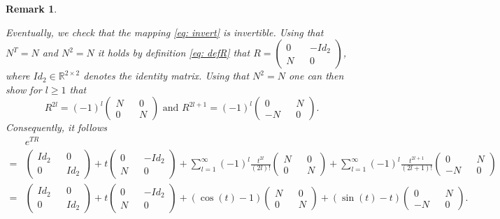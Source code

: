 \documentclass[11pt]{article}
\newcommand{\R}{\mathbb R}
\newtheorem{remark}{Remark}[section]
\begin{document}
\begin{remark}
\begin{enumerate}
Eventually, we check that the mapping \eqref{eq: invert} is invertible.
Using that $N^T = N$ and $N^2=N$ it holds by definition \eqref{eq: defR} that  $R = \begin{pmatrix}
    0 && - Id_2 \\ N && 0
\end{pmatrix}$, where $Id_2 \in \R^{2\times 2}$ denotes the identity matrix.
Using that $N^2 = N$ one can then show for $l\geq 1$ that
\[
R^{2l} = (-1)^l \begin{pmatrix}
    N && 0 \\ 0 && N
\end{pmatrix} \text{ and } R^{2l+1} = (-1)^l \begin{pmatrix}
    0 && N \\ -N && 0
\end{pmatrix}.
\]
Consequently, it follows 
\begin{align*}
&e^{TR} \\ = &\begin{pmatrix}
    Id_2 && 0  \\ 0 && Id_2
\end{pmatrix} + t \begin{pmatrix}
    0 && - Id_2 \\ N && 0
\end{pmatrix} + \sum_{l=1}^{\infty} (-1)^l \frac{t^{2l}}{(2l)!} \begin{pmatrix}
    N && 0 \\ 0 && N
\end{pmatrix} + \sum_{l=1}^{\infty} (-1)^l \frac{t^{2l+1}}{(2l+1)!} \begin{pmatrix}
    0 && N \\ -N && 0
\end{pmatrix} \\
= &\begin{pmatrix}
    Id_2 && 0  \\ 0 && Id_2
\end{pmatrix} + t \begin{pmatrix}
    0 && - Id_2 \\ N && 0
\end{pmatrix} + (\cos(t)-1) \begin{pmatrix}
    N && 0 \\ 0 && N
\end{pmatrix}+  (\sin(t) - t) \begin{pmatrix}
    0 && N \\ -N && 0
\end{pmatrix}.
\end{align*}

\end{enumerate}
\end{remark}
\end{document}
